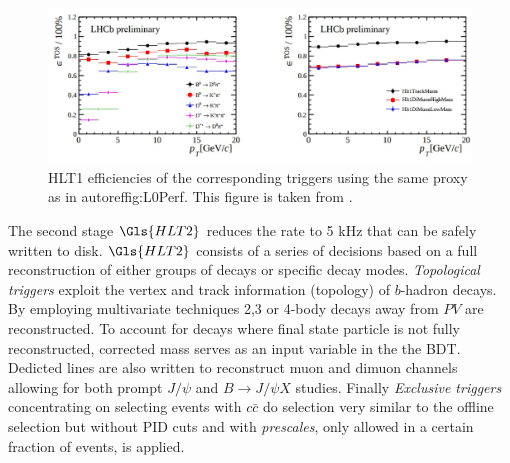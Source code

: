 \begin{figure}[!h]
	\centering
	\includegraphics[width = 1.0\textwidth]{figs/detector/HLT1performance.eps}%
	\caption{ \Gls{HLT1} efficiencies of the corresponding triggers using the same proxy as in autoref{fig:L0Perf}.  This figure is taken from \cite{Albrecht:2013fba}. }  
	\label{fig:L0Perf}
\end{figure}

The second stage $\Gls{HLT2}$ reduces the rate to 5 kHz that can be safely written to disk. $\Gls{HLT2}$ consists of a series of decisions based on a full reconstruction of either groups of decays or specific decay modes. \textit{Topological triggers} exploit the vertex and track information (topology) of $b$-hadron decays. By employing multivariate techniques 2,3 or 4-body decays away from $PV$ are reconstructed. To account for decays where final state particle is not fully reconstructed, corrected mass serves as an input variable in the the \Gls{BDT}. Dedicted lines are also written to reconstruct muon and dimuon channels allowing for both prompt $J/\psi$ and $B\rightarrow J/\psi X$ studies. Finally \textit{Exclusive triggers} concentrating on selecting events with $c\bar{c}$ do selection very similar to the offline selection but without \Gls{PID} cuts and with \textit{prescales}, only allowed in a certain fraction of events, is applied.




